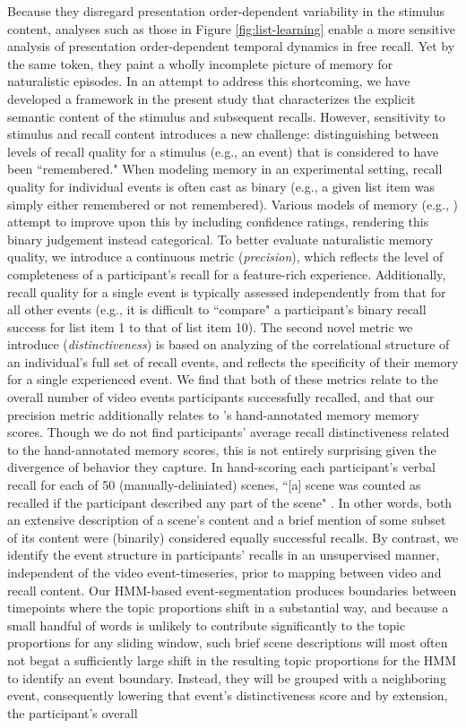 \documentclass{article}
\begin{document}
Because they disregard presentation order-dependent variability in the stimulus content, analyses such as those in Figure \ref{fig:list-learning} enable a more sensitive analysis of presentation order-dependent temporal dynamics in free recall. Yet by the same token, they paint a wholly incomplete picture of memory for naturalistic episodes.  In an attempt to address this shortcoming, we have developed a framework in the present study that characterizes the explicit semantic content of the stimulus and subsequent recalls.  However, sensitivity to stimulus and recall content introduces a new challenge: distinguishing between levels of recall quality for a stimulus (e.g., an event) that is considered to have been ``remembered."  When modeling memory in an experimental setting, recall quality for individual events is often cast as binary (e.g., a given list item was simply either remembered or not remembered).  Various models of memory (e.g., \citealp{Yone02}) attempt to improve upon this by including confidence ratings, rendering this binary judgement instead categorical.  To better evaluate naturalistic memory quality, we introduce a continuous metric (\textit{precision}), which reflects the level of completeness of a participant's recall for a feature-rich experience.  Additionally, recall quality for a single event is typically assessed independently from that for all other events (e.g., it is difficult to ``compare" a participant's binary recall success for list item 1 to that of list item 10).  The second novel metric we introduce (\textit{distinctiveness}) is based on analyzing of the correlational structure of an individual's full set of recall events, and reflects the specificity of their memory for a single experienced event.  We find that both of these metrics relate to the overall number of video events participants successfully recalled, and that our precision metric additionally relates to \cite{ChenEtal17}'s hand-annotated memory memory scores.  Though we do not find participants' average recall distinctiveness related to the hand-annotated memory scores, this is not entirely surprising given the divergence of behavior they capture.  In hand-scoring each participant's verbal recall for each of 50 (manually-deliniated) scenes, ``[a] scene was counted as recalled if the participant described any part of the scene" \citep{ChenEtal17}.  In other words, both an extensive description of a scene's content and a brief mention of some subset of its content were (binarily) considered equally successful recalls.  By contrast, we identify the event structure in participants' recalls in an unsupervised manner, independent of the video event-timeseries, prior to mapping between video and recall content.  Our HMM-based event-segmentation produces boundaries between timepoints where the topic proportions shift in a substantial way, and because a small handful of words is unlikely to contribute significantly to the topic proportions for any sliding window, such brief scene descriptions will most often not begat a sufficiently large shift in the resulting topic proportions for the HMM to identify an event boundary.  Instead, they will be grouped with a neighboring event, consequently lowering that event's distinctiveness score and by extension, the participant's overall 
\end{document}
